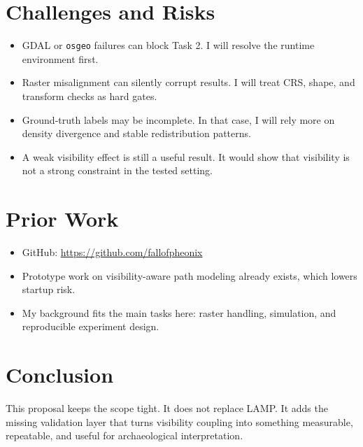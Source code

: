 \documentclass[11pt,a4paper]{article}
\begin{document}
\clearpage

\section{Challenges and Risks}

\begin{itemize}[leftmargin=1.4em]
    \item GDAL or \texttt{osgeo} failures can block Task 2. I will resolve the runtime environment first.
    \item Raster misalignment can silently corrupt results. I will treat CRS, shape, and transform checks as hard gates.
    \item Ground-truth labels may be incomplete. In that case, I will rely more on density divergence and stable redistribution patterns.
    \item A weak visibility effect is still a useful result. It would show that visibility is not a strong constraint in the tested setting.
\end{itemize}

\section{Prior Work}

\begin{itemize}[leftmargin=1.4em]
    \item GitHub: \url{https://github.com/fallofpheonix}
    \item Prototype work on visibility-aware path modeling already exists, which lowers startup risk.
    \item My background fits the main tasks here: raster handling, simulation, and reproducible experiment design.
\end{itemize}

\section{Conclusion}

This proposal keeps the scope tight. It does not replace LAMP. It adds the missing validation layer that turns visibility coupling into something measurable, repeatable, and useful for archaeological interpretation.
\end{document}
